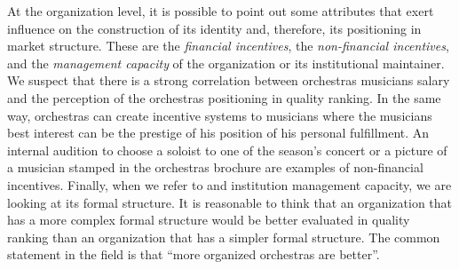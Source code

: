 \documentclass[a4paper, 12pt, openright, oneside, german, french, brazil, english, article]{abntex2}
\begin{document}
	
	At the organization level, it is possible to point out some attributes that exert influence on the construction of its identity and, therefore, its positioning in market structure. These are the \textit{financial incentives}, the \textit{non-financial incentives}, and  the \textit{management capacity} of the organization or its institutional maintainer. We suspect that there is a strong correlation between orchestras musicians salary and the perception of the orchestras positioning in quality ranking. In the same way, orchestras can create incentive systems to musicians where the musicians best interest can be the prestige of his position of his personal fulfillment. An internal audition to choose a soloist to one of the season's concert or a picture of a musician stamped in the orchestras brochure are examples of non-financial incentives. Finally, when we refer to and institution management capacity, we are looking at its formal structure. It is reasonable to think that an organization that has a more complex formal structure would be better evaluated in quality ranking than an organization that has a simpler formal structure. The common statement in the field is that ``more organized orchestras are better''.
	
\end{document}
